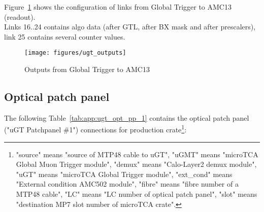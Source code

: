 Figure~\ref{fig:app:ugt_outputs} shows the configuration of links from Global Trigger to AMC13 (readout).\\
Links 16..24 contains algo data (after GTL, after BX mask and after prescalers), link 25 contains several counter values.

\begin{figure}[htb]
\centering
\texttt{[image: figures/ugt\_outputs]}
\caption{Outputs from Global Trigger to AMC13}
\label{fig:app:ugt_outputs}
\end{figure}

\clearpage

\subsection{Optical patch panel}\label{sec:app:app_d}

The following Table~\ref{tab:app:ugt_opt_pp_1} contains the optical patch panel ("uGT Patchpanel \#1") connections for production crate\footnote{"source" means "source of MTP48 cable to uGT", "uGMT" means "microTCA Global Muon Trigger module", "demux" means "Calo-Layer2 demux module", "uGT" means "microTCA Global Trigger module", "ext\_cond" means "External condition AMC502 module", "fibre" means "fibre number of a MTP48 cable", "LC" means "LC number of optical patch panel", "slot" means "destination MP7 slot number of microTCA crate".\label{note_ugt_opt_pp_1}}:

